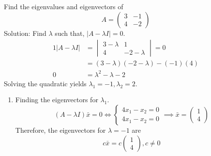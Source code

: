\documentclass[diffeq.tex]{subfiles}
\begin{document}
    \begin{example}
        Find the eigenvalues and eigenvectors of
        \begin{equation}
            A = \begin{pmatrix}
                3 & -1\\
                4 & -2
            \end{pmatrix}
        \end{equation}
        Solution: Find $\lambda$ such that, $|A - \lambda I| = 0$.
        \begin{alignat}{1}
            |A - \lambda I| &= \begin{vmatrix}
                3 - \lambda & 1\\
                4 & -2-\lambda
            \end{vmatrix} = 0\\
            &= (3 - \lambda)(-2-\lambda) - (-1)(4)\\
            0 &= \lambda^{2} - \lambda - 2
        \end{alignat}
        Solving the quadratic yields $\lambda_{1} = -1, \lambda_{2} = 2$.
        \begin{enumerate}
            \item Finding the eigenvectors for $\lambda_{1}$.
            \begin{equation}
                (A - \lambda I)\bar{x} = 0 \iff \begin{cases}
                    4x_{1} - x_{2} = 0\\
                    4x_{1} - x_{2} = 0
                \end{cases} \implies \bar{x} = \begin{pmatrix}
                    1\\
                    4
                \end{pmatrix}
            \end{equation}
            Therefore, the eigenvectors for $\lambda = -1$ are
            \begin{equation}
                c\bar{x} = c\begin{pmatrix}
                    1\\
                    4
                \end{pmatrix}, c \neq 0
            \end{equation}
        \end{enumerate} %
    \end{example}
\end{document}
